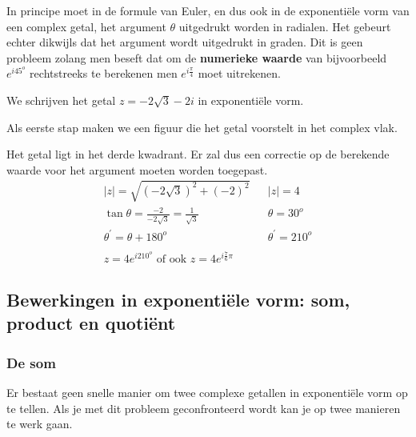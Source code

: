 In principe moet in de formule van Euler, en dus ook in de exponenti\"{e}le vorm van een complex getal, het argument $\theta$ uitgedrukt worden in radialen. Het gebeurt echter dikwijls dat het argument wordt uitgedrukt in graden. Dit is geen probleem zolang men beseft dat om de {\bf numerieke waarde} van bijvoorbeeld $e^{i 45^{o}}$ rechtstreeks te berekenen men $e^{i\frac{\pi}{4}}$ moet uitrekenen.\\
	

\begin{voorbeeld}
	We schrijven het getal $z=-2\sqrt{3}-2i$ in exponenti\"{e}le vorm.\\

\vspace{0.3cm}

Als eerste stap maken we een figuur die het getal voorstelt in het complex vlak.\\


Het getal ligt in het derde kwadrant. Er zal dus een correctie op de berekende waarde voor het argument moeten worden toegepast.\\

\[ \begin{array}{lll}
	|z|=\sqrt{(-2\sqrt{3})^2 +(-2)^2} & & |z|=4 \\
	\tan \theta = \frac{-2}{-2\sqrt{3}}=\frac{1}{\sqrt{3}} & & \theta = 30^{o}\\
	\theta^{'}=\theta+180^{o} & & \theta^{'}=210^{o} \\
	&  &          \\
	z=4e^{i210^{o}} \text{ of ook } z=4e^{i\frac{7}{6}\pi}  &  & 
\end{array} \]

\end{voorbeeld}

\subsection{Bewerkingen in exponenti\"{e}le vorm: som, product en quoti\"{e}nt} 

\subsubsection{De som}

Er bestaat geen snelle manier om twee complexe getallen in exponenti\"{e}le vorm op te tellen. Als je met dit probleem geconfronteerd wordt kan je op twee manieren te werk gaan.\\

